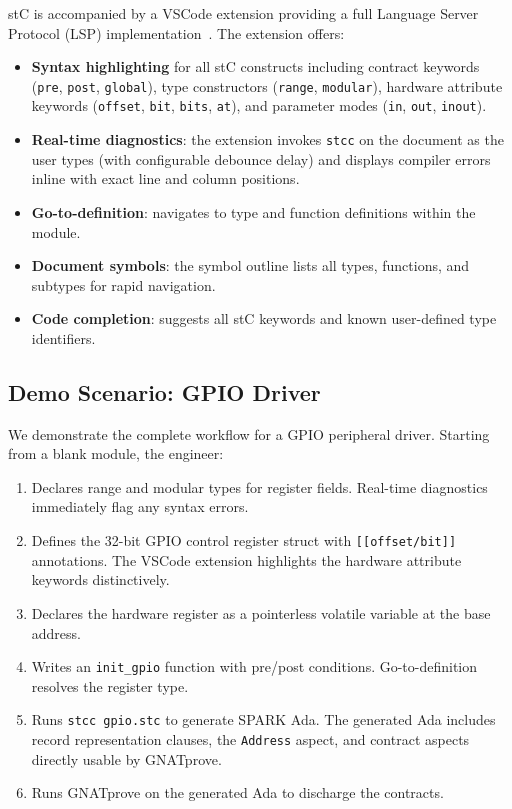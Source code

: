 \documentclass[runningheads]{llncs}
\begin{document}
stC is accompanied by a VSCode extension providing a full Language Server
Protocol (LSP) implementation~\cite{lsp}. The extension offers:

\begin{itemize}
  \item \textbf{Syntax highlighting} for all stC constructs including
        contract keywords (\texttt{pre}, \texttt{post}, \texttt{global}),
        type constructors (\texttt{range}, \texttt{modular}), hardware
        attribute keywords (\texttt{offset}, \texttt{bit}, \texttt{bits},
        \texttt{at}), and parameter modes (\texttt{in}, \texttt{out},
        \texttt{inout}).
  \item \textbf{Real-time diagnostics}: the extension invokes \texttt{stcc}
        on the document as the user types (with configurable debounce delay)
        and displays compiler errors inline with exact line and column
        positions.
  \item \textbf{Go-to-definition}: navigates to type and function definitions
        within the module.
  \item \textbf{Document symbols}: the symbol outline lists all types,
        functions, and subtypes for rapid navigation.
  \item \textbf{Code completion}: suggests all stC keywords and known
        user-defined type identifiers.
\end{itemize}

\subsection{Demo Scenario: GPIO Driver}

We demonstrate the complete workflow for a GPIO peripheral driver. Starting
from a blank module, the engineer:

\begin{enumerate}
  \item Declares range and modular types for register fields. Real-time
        diagnostics immediately flag any syntax errors.
  \item Defines the 32-bit GPIO control register struct with
        \texttt{[[offset/bit]]} annotations. The VSCode extension highlights
        the hardware attribute keywords distinctively.
  \item Declares the hardware register as a pointerless volatile variable
        at the base address.
  \item Writes an \texttt{init\_gpio} function with pre/post conditions.
        Go-to-definition resolves the register type.
  \item Runs \texttt{stcc gpio.stc} to generate SPARK Ada. The generated
        Ada includes record representation clauses, the \texttt{Address}
        aspect, and contract aspects directly usable by GNATprove.
  \item Runs GNATprove on the generated Ada to discharge the contracts.
\end{enumerate}
\end{document}
